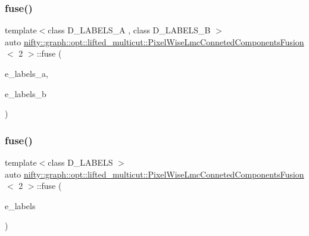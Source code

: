 \subsubsection{\texorpdfstring{fuse()}{fuse()}\hspace{0.1cm}{\footnotesize\ttfamily [1/4]}}
{\footnotesize\ttfamily template$<$class D\+\_\+\+L\+A\+B\+E\+L\+S\+\_\+A , class D\+\_\+\+L\+A\+B\+E\+L\+S\+\_\+B $>$ \\
auto \hyperlink{classnifty_1_1graph_1_1opt_1_1lifted__multicut_1_1PixelWiseLmcConnetedComponentsFusion}{nifty\+::graph\+::opt\+::lifted\+\_\+multicut\+::\+Pixel\+Wise\+Lmc\+Conneted\+Components\+Fusion}$<$ 2 $>$\+::fuse (\begin{DoxyParamCaption}\item[{const xt\+::xexpression$<$ D\+\_\+\+L\+A\+B\+E\+L\+S\+\_\+A $>$ \&}]{e\+\_\+labels\+\_\+a,  }\item[{const xt\+::xexpression$<$ D\+\_\+\+L\+A\+B\+E\+L\+S\+\_\+B $>$ \&}]{e\+\_\+labels\+\_\+b }\end{DoxyParamCaption})\hspace{0.3cm}{\ttfamily [inline]}}

\mbox{\label{classnifty_1_1graph_1_1opt_1_1lifted__multicut_1_1PixelWiseLmcConnetedComponentsFusion_3_012_01_4_af4cb1b970e31478a1a9d608dc0433ba6}} 
\subsubsection{\texorpdfstring{fuse()}{fuse()}\hspace{0.1cm}{\footnotesize\ttfamily [2/4]}}
{\footnotesize\ttfamily template$<$class D\+\_\+\+L\+A\+B\+E\+LS $>$ \\
auto \hyperlink{classnifty_1_1graph_1_1opt_1_1lifted__multicut_1_1PixelWiseLmcConnetedComponentsFusion}{nifty\+::graph\+::opt\+::lifted\+\_\+multicut\+::\+Pixel\+Wise\+Lmc\+Conneted\+Components\+Fusion}$<$ 2 $>$\+::fuse (\begin{DoxyParamCaption}\item[{const xt\+::xexpression$<$ D\+\_\+\+L\+A\+B\+E\+LS $>$ \&}]{e\+\_\+labels }\end{DoxyParamCaption})\hspace{0.3cm}{\ttfamily [inline]}}

